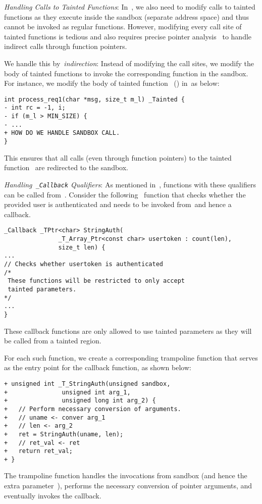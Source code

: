 \noindent\emph{Handling Calls to Tainted Functions}:
In~\cregion, we also need to modify calls to tainted functions as they execute inside the sandbox (separate address space) and thus cannot be invoked as regular functions.
However, modifying every call site of tainted functions is tedious and also requires precise pointer analysis~\cite{milanova2002precise} to handle indirect calls through function pointers.

We handle this by~\emph{indirection}: Instead of modifying the call sites, we modify the body of tainted functions to invoke the corresponding function in the sandbox.
For instance, we modify the body of tainted function~ () in~\cregion as below:
\begin{verbatim}
int process_req1(char *msg, size_t m_l) _Tainted {
- int rc = -1, i;
- if (m_l > MIN_SIZE) {
- ...
+ HOW DO WE HANDLE SANDBOX CALL.
}
\end{verbatim}
This ensures that all calls (even through function pointers) to the tainted function~ are redirected to the sandbox.

\noindent\emph{Handling~\texttt{\_Callback} Qualifiers}:
As mentioned in~, functions with these qualifiers can be called from~\ucregion.
Consider the following~ function that checks whether the provided user is authenticated and needs to be invoked from~\ucregion and hence a callback.
\begin{verbatim}
_Callback _TPtr<char> StringAuth(
               _T_Array_Ptr<const char> usertoken : count(len),
               size_t len) {
...
// Checks whether usertoken is authenticated
/*
 These functions will be restricted to only accept
 tainted parameters.
*/
...
}
\end{verbatim}
These callback functions are only allowed to use tainted parameters as they will be called from a tainted region.


For each such function, we create a corresponding trampoline function that serves as the entry point for the callback function, as shown below:
\begin{verbatim}
+ unsigned int _T_StringAuth(unsigned sandbox,
+               unsigned int arg_1,
+               unsigned long int arg_2) {
+   // Perform necessary conversion of arguments.
+   // uname <- conver arg_1
+   // len <- arg_2
+   ret = StringAuth(uname, len);
+   // ret_val <- ret
+   return ret_val;
+ }
\end{verbatim}
The trampoline function handles the invocations from sandbox (and hence the extra parameter~), performs the necessary conversion of pointer arguments, and eventually invokes the callback.

